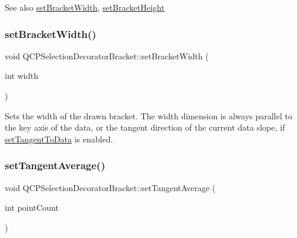 \begin{DoxySeeAlso}{See also}
\mbox{\hyperlink{class_q_c_p_selection_decorator_bracket_a291b59cab98ce93a0a3c85963fe10f5e}{set\+Bracket\+Width}}, \mbox{\hyperlink{class_q_c_p_selection_decorator_bracket_aed773ad737201cca40efc6fe451acad8}{set\+Bracket\+Height}} 
\end{DoxySeeAlso}
\mbox{\label{class_q_c_p_selection_decorator_bracket_a291b59cab98ce93a0a3c85963fe10f5e}} 
\subsubsection{\texorpdfstring{set\+Bracket\+Width()}{setBracketWidth()}}
{\footnotesize\ttfamily void Q\+C\+P\+Selection\+Decorator\+Bracket\+::set\+Bracket\+Width (\begin{DoxyParamCaption}\item[{int}]{width }\end{DoxyParamCaption})}

Sets the width of the drawn bracket. The width dimension is always parallel to the key axis of the data, or the tangent direction of the current data slope, if \mbox{\hyperlink{class_q_c_p_selection_decorator_bracket_a93bc6086e53a5e40a08641a7b2e2cdd5}{set\+Tangent\+To\+Data}} is enabled. \mbox{\label{class_q_c_p_selection_decorator_bracket_adb2d0876f25a77c88042b70818f1d6e4}} 
\subsubsection{\texorpdfstring{set\+Tangent\+Average()}{setTangentAverage()}}
{\footnotesize\ttfamily void Q\+C\+P\+Selection\+Decorator\+Bracket\+::set\+Tangent\+Average (\begin{DoxyParamCaption}\item[{int}]{point\+Count }\end{DoxyParamCaption})}

